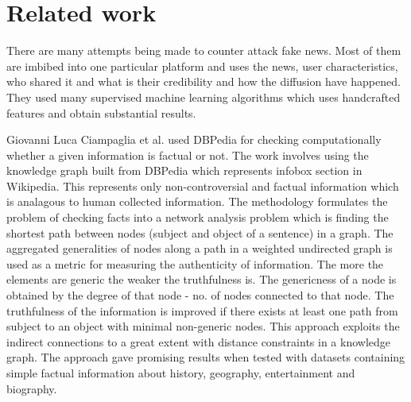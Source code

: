 \documentclass[a4paper, 11pt]{article}
\begin{document}
\section{Related work}



There are many attempts being made to counter attack fake news. Most of them are imbibed into one particular platform and uses the news, user characteristics, who shared it and what is their credibility and how the diffusion have happened. They used many supervised machine learning algorithms which uses handcrafted features and obtain substantial results. 

Giovanni Luca Ciampaglia et al. used DBPedia for checking computationally whether a given information is factual or not. The work involves using the knowledge graph built from DBPedia which represents infobox section in Wikipedia. This represents only non-controversial and factual information which is analagous to human collected information. The methodology formulates the problem of checking facts into a network analysis problem which is finding the shortest path between nodes (subject and object of a sentence) in a graph. The aggregated generalities of nodes along a path in a weighted undirected graph is used as a metric for measuring the authenticity of information. The more the elements are generic the weaker the truthfulness is.  The genericness of a node is obtained by the degree of that node - no. of nodes connected to that node. The truthfulness of the information is improved if there exists at least one path from subject to an object with minimal non-generic nodes. This approach exploits the indirect connections to a great extent with distance constraints in a knowledge graph. The approach gave promising results when tested with datasets containing simple factual information about history, geography, entertainment and biography. 



\end{document}
